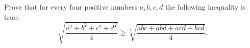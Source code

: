 Prove that for every four positive numbers $a,b,c,d$ the following inequality is true:
$$\sqrt{\frac{a^2+b^2+c^2+d^2}4}\ge\sqrt[3]{\frac{abc+abd+acd+bcd}4}.$$